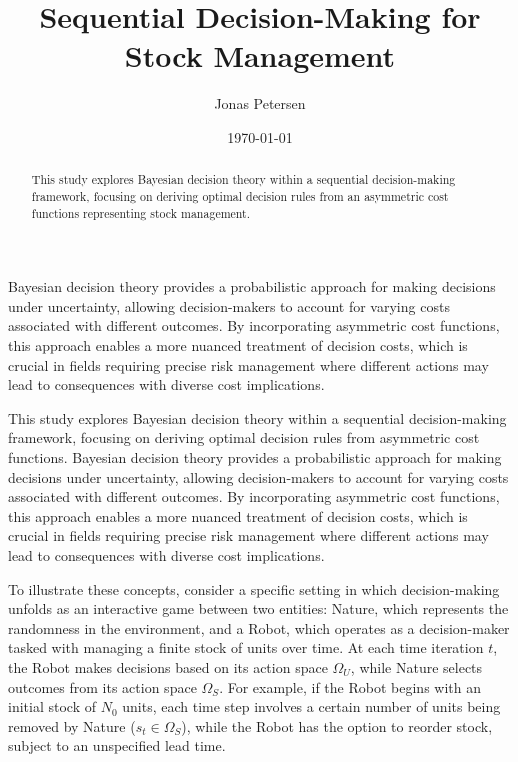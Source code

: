 \documentclass[a4paper,12pt]{article}
\title{Sequential Decision-Making for Stock Management}
\author{Jonas Petersen}
\date{\today}
\theoremstyle{definition}
\begin{document}
	\maketitle
	
	\begin{abstract}
		This study explores Bayesian decision theory within a sequential decision-making framework, focusing on deriving optimal decision rules from an asymmetric cost functions representing stock management.
	\end{abstract}
	
	\noindent
	Bayesian decision theory provides a probabilistic approach for making decisions under uncertainty, allowing decision-makers to account for varying costs associated with different outcomes. By incorporating asymmetric cost functions, this approach enables a more nuanced treatment of decision costs, which is crucial in fields requiring precise risk management where different actions may lead to consequences with diverse cost implications.

	This study explores Bayesian decision theory within a sequential decision-making framework, focusing on deriving optimal decision rules from asymmetric cost functions. Bayesian decision theory provides a probabilistic approach for making decisions under uncertainty, allowing decision-makers to account for varying costs associated with different outcomes. By incorporating asymmetric cost functions, this approach enables a more nuanced treatment of decision costs, which is crucial in fields requiring precise risk management where different actions may lead to consequences with diverse cost implications.
	
	To illustrate these concepts, consider a specific setting in which decision-making unfolds as an interactive game between two entities: Nature, which represents the randomness in the environment, and a Robot, which operates as a decision-maker tasked with managing a finite stock of units over time. At each time iteration $t$, the Robot makes decisions based on its action space $\Omega_U$, while Nature selects outcomes from its action space $\Omega_S$. For example, if the Robot begins with an initial stock of $N_0$ units, each time step involves a certain number of units being removed by Nature ($s_t \in \Omega_S$), while the Robot has the option to reorder stock, subject to an unspecified lead time.
	
\end{document}
